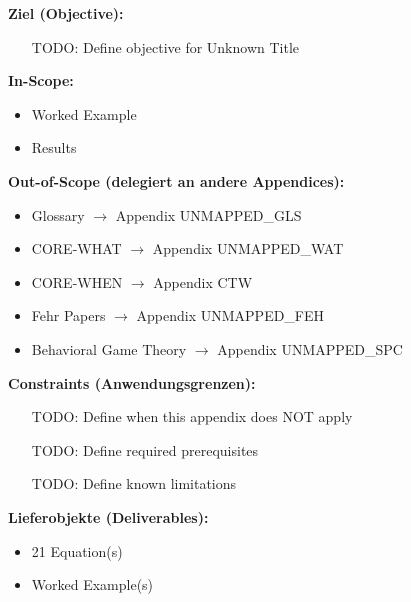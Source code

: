 
\begin{tcolorbox}[
    colback=orange!5!white,
    colframe=orange!75!black,
    title={\textbf{Appendix Scope: Ziel / In-Scope / Out-of-Scope / Constraints}},
    fonttitle=\bfseries
]

\textbf{Ziel (Objective):}
\begin{itemize}[nosep]
    \item [TODO: Define objective for Unknown Title]
\end{itemize}

\textbf{In-Scope:}
\begin{itemize}[nosep]
    \item Worked Example
    \item Results
\end{itemize}

\textbf{Out-of-Scope (delegiert an andere Appendices):}
\begin{itemize}[nosep]
    \item Glossary $\rightarrow$ Appendix UNMAPPED_GLS
    \item CORE-WHAT $\rightarrow$ Appendix UNMAPPED_WAT
    \item CORE-WHEN $\rightarrow$ Appendix CTW
    \item Fehr Papers $\rightarrow$ Appendix UNMAPPED_FEH
    \item Behavioral Game Theory $\rightarrow$ Appendix UNMAPPED_SPC
\end{itemize}

\textbf{Constraints (Anwendungsgrenzen):}
\begin{itemize}[nosep]
    \item [TODO: Define when this appendix does NOT apply]
    \item [TODO: Define required prerequisites]
    \item [TODO: Define known limitations]
\end{itemize}

\textbf{Lieferobjekte (Deliverables):}
\begin{itemize}[nosep]
    \item 21 Equation(s)
    \item Worked Example(s)
\end{itemize}

\end{tcolorbox}


